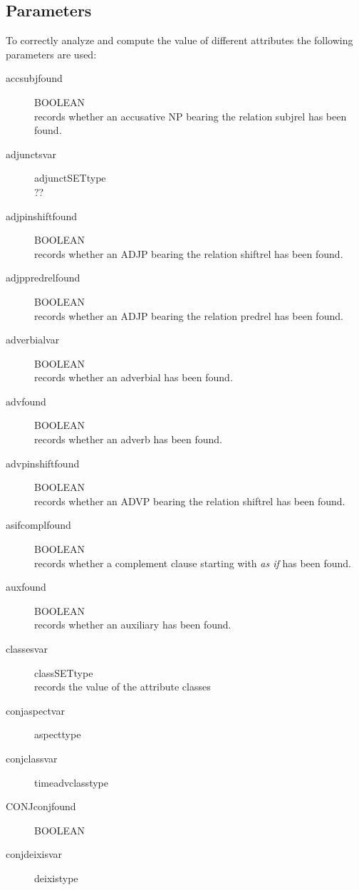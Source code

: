 \subsection{Parameters}
To correctly analyze and compute the value of different attributes the 
following parameters are used:\\
\begin{description}
\item [accsubjfound       ] BOOLEAN\\
records whether an accusative NP bearing the relation subjrel has been found. 
\item [adjunctsvar        ] adjunctSETtype\\
??
\item [adjpinshiftfound   ] BOOLEAN\\
records whether an ADJP bearing the relation shiftrel has been found.
\item [adjppredrelfound   ] BOOLEAN\\
records whether an ADJP bearing the relation predrel has been found.
\item [adverbialvar       ] BOOLEAN\\
records whether an adverbial has been found.
\item [advfound           ] BOOLEAN\\
records whether an adverb has been found.
\item [advpinshiftfound   ] BOOLEAN\\
records whether an ADVP bearing the relation shiftrel has been found.
\item [asifcomplfound     ] BOOLEAN\\
records whether a complement clause starting with {\em as if} has been found.
\item [auxfound           ] BOOLEAN\\
records whether an auxiliary has been found.
\item [classesvar         ] classSETtype\\
records the value of the attribute classes
\item [conjaspectvar      ] aspecttype\\
\item [conjclassvar       ] timeadvclasstype\\
\item [CONJconjfound      ] BOOLEAN\\
\item [conjdeixisvar      ] deixistype\\

\end{description}
